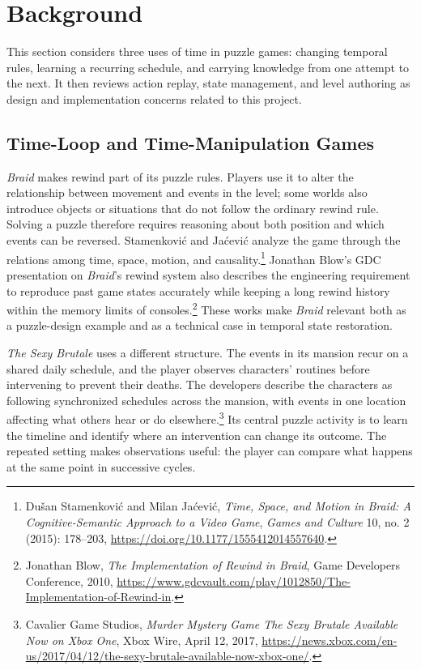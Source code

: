 ﻿\section{Background}

This section considers three uses of time in puzzle games: changing temporal rules, learning a recurring schedule, and carrying knowledge from one attempt to the next. It then reviews action replay, state management, and level authoring as design and implementation concerns related to this project.

\subsection{Time-Loop and Time-Manipulation Games}

\textit{Braid} makes rewind part of its puzzle rules. Players use it to alter the relationship between movement and events in the level; some worlds also introduce objects or situations that do not follow the ordinary rewind rule. Solving a puzzle therefore requires reasoning about both position and which events can be reversed. Stamenkovi\'c and Ja\'cevi\'c analyze the game through the relations among time, space, motion, and causality.\footnote{Du\v{s}an Stamenkovi\'c and Milan Ja\'cevi\'c, \textit{Time, Space, and Motion in Braid: A Cognitive-Semantic Approach to a Video Game}, \textit{Games and Culture} 10, no. 2 (2015): 178--203, \url{https://doi.org/10.1177/1555412014557640}.} Jonathan Blow's GDC presentation on \textit{Braid}'s rewind system also describes the engineering requirement to reproduce past game states accurately while keeping a long rewind history within the memory limits of consoles.\footnote{Jonathan Blow, \textit{The Implementation of Rewind in Braid}, Game Developers Conference, 2010, \url{https://www.gdcvault.com/play/1012850/The-Implementation-of-Rewind-in}.} These works make \textit{Braid} relevant both as a puzzle-design example and as a technical case in temporal state restoration.

\textit{The Sexy Brutale} uses a different structure. The events in its mansion recur on a shared daily schedule, and the player observes characters' routines before intervening to prevent their deaths. The developers describe the characters as following synchronized schedules across the mansion, with events in one location affecting what others hear or do elsewhere.\footnote{Cavalier Game Studios, \textit{Murder Mystery Game The Sexy Brutale Available Now on Xbox One}, Xbox Wire, April 12, 2017, \url{https://news.xbox.com/en-us/2017/04/12/the-sexy-brutale-available-now-xbox-one/}.} Its central puzzle activity is to learn the timeline and identify where an intervention can change its outcome. The repeated setting makes observations useful: the player can compare what happens at the same point in successive cycles.

